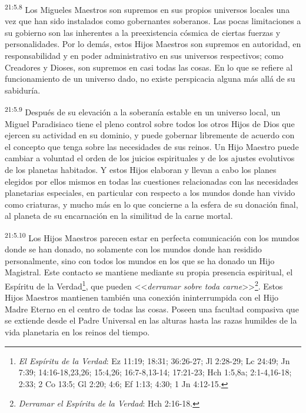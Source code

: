 \par
\textsuperscript{21:5.8} Los Migueles Maestros son supremos en sus propios universos locales una vez que han sido instalados como gobernantes soberanos. Las pocas limitaciones a su gobierno son las inherentes a la preexistencia cósmica de ciertas fuerzas y personalidades. Por lo demás, estos Hijos Maestros son supremos en autoridad, en responsabilidad y en poder administrativo en sus universos respectivos; como Creadores y Dioses, son supremos en casi todas las cosas. En lo que se refiere al funcionamiento de un universo dado, no existe perspicacia alguna más allá de su sabiduría.

\par
\textsuperscript{21:5.9} Después de su elevación a la soberanía estable en un universo local, un Miguel Paradisiaco tiene el pleno control sobre todos los otros Hijos de Dios que ejercen su actividad en su dominio, y puede gobernar libremente de acuerdo con el concepto que tenga sobre las necesidades de sus reinos. Un Hijo Maestro puede cambiar a voluntad el orden de los juicios espirituales y de los ajustes evolutivos de los planetas habitados. Y estos Hijos elaboran y llevan a cabo los planes elegidos por ellos mismos en todas las cuestiones relacionadas con las necesidades planetarias especiales, en particular con respecto a los mundos donde han vivido como criaturas, y mucho más en lo que concierne a la esfera de su donación final, al planeta de su encarnación en la similitud de la carne mortal.

\par
\textsuperscript{21:5.10} Los Hijos Maestros parecen estar en perfecta comunicación con los mundos donde se han donado, no solamente con los mundos donde han residido personalmente, sino con todos los mundos en los que se ha donado un Hijo Magistral. Este contacto se mantiene mediante su propia presencia espiritual, el Espíritu de la Verdad\footnote{\textit{El Espíritu de la Verdad}: Ez 11:19; 18:31; 36:26-27; Jl 2:28-29; Lc 24:49; Jn 7:39; 14:16-18,23,26; 15:4,26; 16:7-8,13-14; 17:21-23; Hch 1:5,8a; 2:1-4,16-18; 2:33; 2 Co 13:5; Gl 2:20; 4:6; Ef 1:13; 4:30; 1 Jn 4:12-15.}, que pueden <<\textit{derramar sobre toda carne}>>\footnote{\textit{Derramar el Espíritu de la Verdad}: Hch 2:16-18.}. Estos Hijos Maestros mantienen también una conexión ininterrumpida con el Hijo Madre Eterno en el centro de todas las cosas. Poseen una facultad compasiva que se extiende desde el Padre Universal en las alturas hasta las razas humildes de la vida planetaria en los reinos del tiempo.


